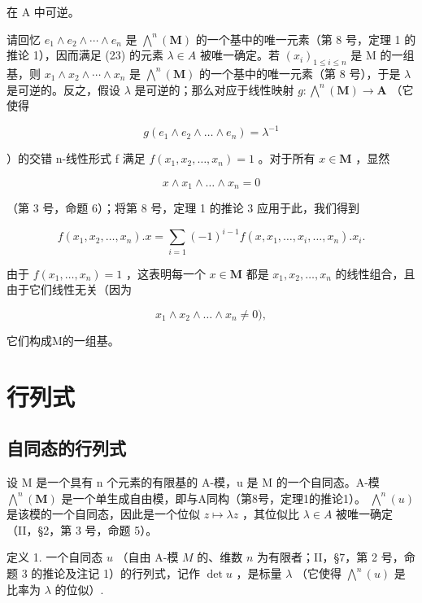 在 A 中可逆。

请回忆 \(e_{1} \wedge e_{2} \wedge \cdots \wedge e_{n}\) 是 \(\bigwedge^{n}(\mathbf{M})\) 的一个基中的唯一元素（第 8 号，定理 1 的推论 1），因而满足 (23) 的元素 \(\lambda \in A\) 被唯一确定。若 \((x_{i})_{1 \leqslant i \leqslant n}\) 是 M 的一组基，则 \(x_{1} \wedge x_{2} \wedge \cdots \wedge x_{n}\) 是 \(\bigwedge^{n}(\mathbf{M})\) 的一个基中的唯一元素（第 8 号），于是 \(\lambda\) 是可逆的。反之，假设 \(\lambda\) 是可逆的；那么对应于线性映射 \(g: \bigwedge^{n}(\mathbf{M}) \to \mathbf{A}\) （它使得

\[
g (e _ {1} \wedge e _ {2} \wedge \dots \wedge e _ {n}) = \lambda^ {- 1}
\]

）的交错 n-线性形式 f 满足 \(f(x_{1}, x_{2}, \ldots, x_{n}) = 1\) 。对于所有 \(x \in \mathbf{M}\) ，显然

\[
x \wedge x _ {1} \wedge \dots \wedge x _ {n} = 0
\]

（第 3 号，命题 6）；将第 8 号，定理 1 的推论 3 应用于此，我们得到

\[
f (x _ {1}, x _ {2}, \dots , x _ {n}). x = \sum_ {i = 1} (- 1) ^ {i - 1} f (x, x _ {1}, \dots , \hat {x} _ {i}, \dots , x _ {n}). x _ {i}.
\]

由于 \(f(x_{1},\ldots ,x_{n}) = 1\) ，这表明每一个 \(x\in \mathbf{M}\) 都是 \(x_{1},x_{2},\ldots ,x_{n}\) 的线性组合，且由于它们线性无关（因为

\[
x _ {1} \wedge x _ {2} \wedge \dots \wedge x _ {n} \neq 0),
\]

它们构成M的一组基。

\section{行列式}

\subsection{自同态的行列式}

设 M 是一个具有 n 个元素的有限基的 A-模，u 是 M 的一个自同态。A-模 \(\bigwedge^{n}(\mathbf{M})\) 是一个单生成自由模，即与A同构（第8号，定理1的推论1）。 \(\bigwedge^{n}(u)\) 是该模的一个自同态，因此是一个位似 \(z \mapsto \lambda z\) ，其位似比 \(\lambda \in A\) 被唯一确定（II，§2，第 3 号，命题 5）。

定义 1. 一个自同态 \(u\) （自由 A-模 \(M\) 的、维数 \(n\) 为有限者；II，§7，第 2 号，命题 3 的推论及注记 1）的行列式，记作 \(\det u\) ，是标量 \(\lambda\) （它使得 \(\bigwedge^{n}(u)\) 是比率为 \(\lambda\) 的位似）.

